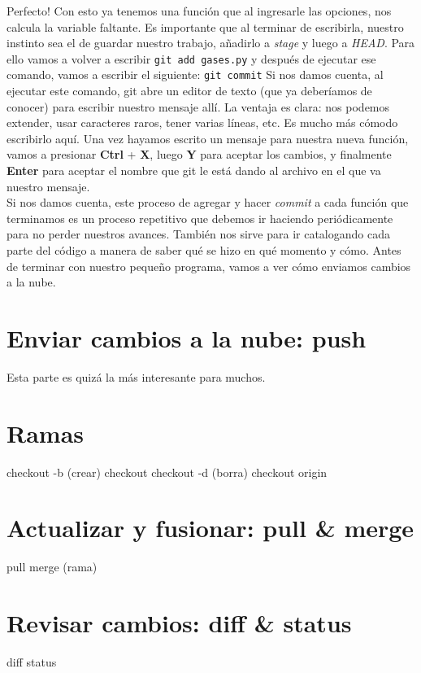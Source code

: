 \documentclass[10pt,letterpaper]{article}
\newcommand{\inlinecode}[1]{
\colorbox{light-gray}{\texttt{#1}}
}
\begin{document}
Perfecto! Con esto ya tenemos una funci\'on que al ingresarle las opciones, nos calcula la variable faltante. Es importante que al terminar de escribirla, nuestro instinto sea el de guardar nuestro trabajo, a\~nadirlo a \textit{stage} y luego a \textit{HEAD}. Para ello vamos a volver a escribir \inlinecode{git add gases.py} y despu\'es de ejecutar ese comando, vamos a escribir el siguiente: \inlinecode{git commit} Si nos damos cuenta, al ejecutar este comando, git abre un editor de texto (que ya deber\'iamos de conocer) para escribir nuestro mensaje all\'i. La ventaja es clara: nos podemos extender, usar caracteres raros, tener varias l\'ineas, etc. Es mucho m\'as c\'omodo escribirlo aqu\'i. Una vez hayamos escrito un mensaje para nuestra nueva funci\'on, vamos a presionar \textbf{Ctrl} + \textbf{X}, luego \textbf{Y} para aceptar los cambios, y finalmente \textbf{Enter} para aceptar el nombre que git le est\'a dando al archivo en el que va nuestro mensaje.\\

Si nos damos cuenta, este proceso de agregar y hacer \emph{commit} a cada funci\'on que terminamos es un proceso repetitivo que debemos ir haciendo peri\'odicamente para no perder nuestros avances. Tambi\'en nos sirve para ir catalogando cada parte del c\'odigo a manera de saber qu\'e se hizo en qu\'e momento y c\'omo. Antes de terminar con nuestro peque\~no programa, vamos a ver c\'omo enviamos cambios a la nube.

\section{Enviar cambios a la nube: push}
Esta parte es quiz\'a la m\'as interesante para muchos.

\section{Ramas}
checkout -b (crear)
checkout
checkout -d (borra)
checkout origin

\section{Actualizar y fusionar: pull \& merge}
pull
merge (rama)

\section{Revisar cambios: diff \& status}
diff
status
\end{document}
